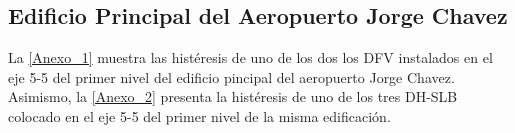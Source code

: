 \subsection*{Edificio Principal del Aeropuerto Jorge Chavez}
{}

La \autoref{Anexo_1} muestra las histéresis de uno de los dos los DFV instalados en el eje 5-5 del primer nivel del edificio pincipal del aeropuerto Jorge Chavez. Asimismo, la \autoref{Anexo_2} presenta la histéresis de uno de los tres DH-SLB colocado en el eje 5-5 del primer nivel de la misma edificación.


